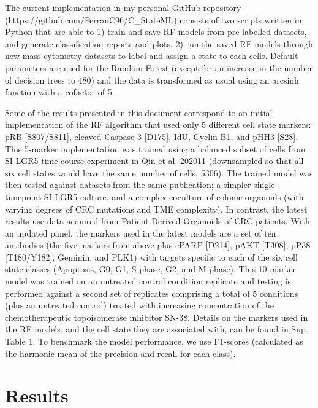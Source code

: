 The current implementation in my personal GitHub repository (https://github.com/FerranC96/C\_StateML) consists of two scripts written in Python that are able to 1) train and save RF models from pre-labelled datasets, and generate classification reports and plots, 2) run the saved RF models through new mass cytometry datasets to label and assign a state to each cells. Default parameters are used for the Random Forest (except for an increase in the number of decision trees to 480) and the data is transformed as usual using an arcsinh function with a cofactor of 5. 

Some of the results presented in this document correspond to an initial implementation of the RF algorithm that used only 5 different cell state markers: pRB [S807/S811], cleaved Caspase 3 [D175], IdU, Cyclin B1, and pHH3 [S28]. This 5-marker implementation was trained using a balanced subset of cells from SI LGR5 time-course experiment in Qin et al. 202011 (downsampled so that all six cell states would have the same number of cells, 5306). The trained model was then tested against datasets from the same publication; a simpler single-timepoint SI LGR5 culture, and a complex coculture of colonic organoids (with varying degrees of CRC mutations and TME complexity).
In contrast, the latest results use data acquired from Patient Derived Organoids of CRC patients. With an updated panel, the markers used in the latest models are a set of ten antibodies (the five markers from above plus cPARP [D214], pAKT [T308], pP38 [T180/Y182], Geminin, and PLK1) with targets specific to each of the six cell state classes (Apoptosis, G0, G1, S-phase, G2, and M-phase). This 10-marker model was trained on an untreated control condition replicate and testing is performed against a second set of replicates comprising a total of 5 conditions (plus an untreated control) treated with increasing concentration of the chemotherapeutic topoisomerase inhibitor SN-38.
Details on the markers used in the RF models, and the cell state they are associated with, can be found in Sup. Table 1. To benchmark the model performance, we use F1-scores (calculated as the harmonic mean of the precision and recall for each class).

\section*{Results}

